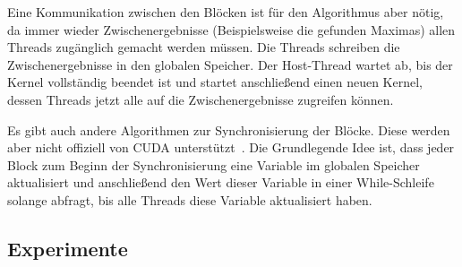 \documentclass{scrartcl}
\begin{document}
Eine Kommunikation zwischen den Blöcken ist für den Algorithmus aber nötig, da immer wieder Zwischenergebnisse (Beispielsweise die gefunden Maximas) allen Threads zugänglich gemacht werden müssen.
Die Threads schreiben die Zwischenergebnisse in den globalen Speicher. Der Host-Thread wartet ab, bis der Kernel vollständig beendet ist und startet anschließend einen neuen Kernel, dessen Threads jetzt alle auf die Zwischenergebnisse zugreifen können.

Es gibt auch andere Algorithmen zur Synchronisierung der Blöcke. Diese werden aber nicht offiziell von CUDA unterstützt~\cite{interblockgpusync}.
Die Grundlegende Idee ist, dass jeder Block zum Beginn der Synchronisierung eine Variable im globalen Speicher aktualisiert und anschließend den Wert dieser Variable in einer While-Schleife solange abfragt, bis alle Threads diese Variable aktualisiert haben.
\subsection{Experimente}

\pagebreak
\nocite{parallelreduction}
\nocite{interblockgpusync}
\nocite{introductiontosvm}
\nocite{diplomarbeit}
\nocite{libsvm}
\nocite{cudaprogrammingguide}


{}

\end{document}

